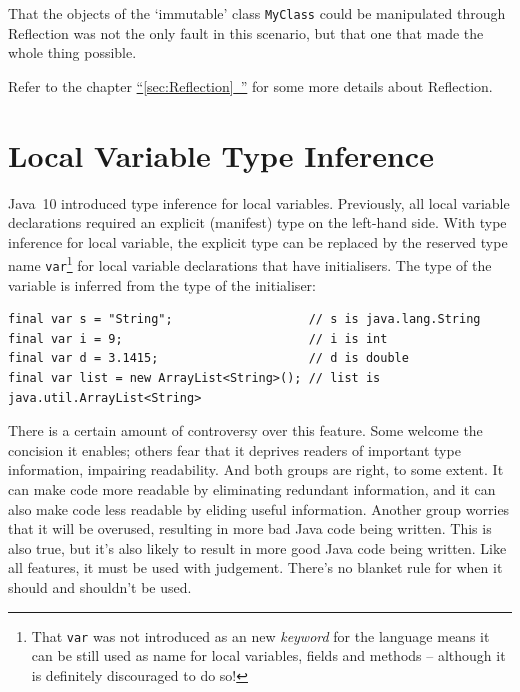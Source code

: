 \documentclass[11pt,a4paper, titlepage, parskip=half, headsepline, footsepline, cleardoublepage=current, headheight=1cm]{scrbook}
\newcommand*{\tqfullref}[1]{\hyperref[{#1}]{“\ref*{#1}~\nameref*{#1}”}}
\begin{document}
That the objects of the ‘immutable’ class \lstinline|MyClass| could be manipulated through Reflection was not the only fault in this scenario, but that one that made the whole thing possible.

Refer to the chapter \tqfullref{sec:Reflection} for some more details about Reflection.


\section{Local Variable Type Inference}\label{sec:LocalVariableTypeInference}
Java~10 introduced type inference\autocite{ORACLE_DOC_LANGUAGE_SPECIFICATION:TypeInference} for local variables\autocite{ORACLE_DOC_LANGUAGE_SPECIFICATION:LocalVariableDeclarations,Marks:LocalVariableTypeInference,Urma:LocalVariableTypeInference}. Previously, all local variable declarations required an explicit (manifest) type on the left-hand side. With type inference for local variable, the explicit type can be replaced by the reserved type name \lstinline|var|\footnote{That \lstinline|var| was not introduced as an new \textit{keyword} for the language means it can be still used as name for local variables, fields and methods – although it is definitely discouraged to do so!} for local variable declarations that have initialisers. The type of the variable is inferred from the type of the initialiser:
\begin{lstlisting}
final var s = "String";                   // s is java.lang.String
final var i = 9;                          // i is int
final var d = 3.1415;                     // d is double
final var list = new ArrayList<String>(); // list is java.util.ArrayList<String>
\end{lstlisting}

There is a certain amount of controversy over this feature. Some welcome the concision it enables; others fear that it deprives readers of important type information, impairing readability. And both groups are right, to some extent. It can make code more readable by eliminating redundant information, and it can also make code less readable by eliding useful information. Another group worries that it will be overused, resulting in more bad Java code being written. This is also true, but it’s also likely to result in more good Java code being written. Like all features, it must be used with judgement. There’s no blanket rule for when it should and shouldn’t be used. 
\end{document}
